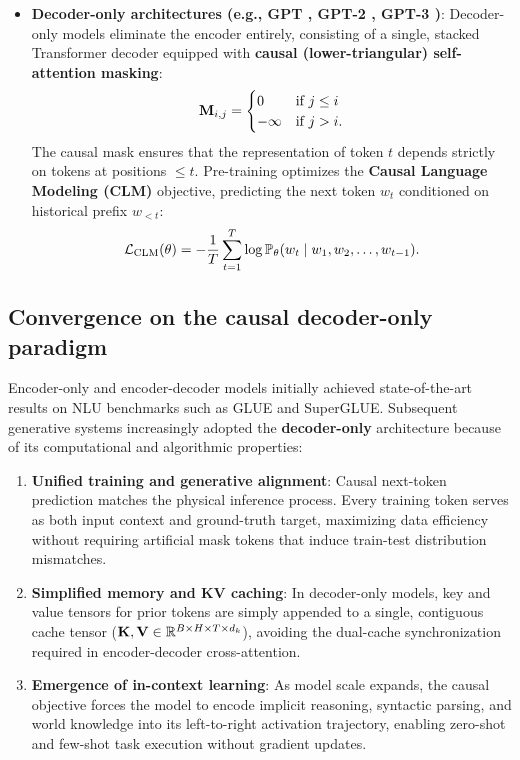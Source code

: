 \documentclass[../../main.tex]{subfiles}
\begin{document}
\begin{itemize}
    \item \textbf{Decoder-only architectures (e.g., GPT \cite{radford2018}, GPT-2 \cite{radford2019}, GPT-3 \cite{brown2020})}:
    Decoder-only models eliminate the encoder entirely, consisting of a single, stacked Transformer decoder equipped with \textbf{causal (lower-triangular) self-attention masking}:
    \begin{equation}
    \label{eq:causal_mask_matrix}
    \mathbf{M}_{i,j} = \begin{cases} 0 & \text{if } j \le i \\ -\infty & \text{if } j > i. \end{cases}
    \end{equation}
    The causal mask ensures that the representation of token $t$ depends strictly on tokens at positions $\le t$. Pre-training optimizes the \textbf{Causal Language Modeling (CLM)} objective, predicting the next token $w_t$ conditioned on historical prefix $w_{<t}$:
    \begin{equation}
    \label{eq:clm_objective_formal}
    \mathcal{L}_{\text{CLM}}(\theta) = -\frac{1}{T} \sum_{t=1}^T \log \mathbb{P}_\theta(w_t \mid w_1, w_2, \dots, w_{t-1}).
    \end{equation}
\end{itemize}

\subsection{Convergence on the causal decoder-only paradigm}
\label{subsec:decoder_only_dominance}

Encoder-only and encoder-decoder models initially achieved state-of-the-art results on NLU benchmarks such as GLUE and SuperGLUE. Subsequent generative systems increasingly adopted the \textbf{decoder-only} architecture because of its computational and algorithmic properties:
\begin{enumerate}
    \item \textbf{Unified training and generative alignment}: Causal next-token prediction matches the physical inference process. Every training token serves as both input context and ground-truth target, maximizing data efficiency without requiring artificial mask tokens that induce train-test distribution mismatches.
    \item \textbf{Simplified memory and KV caching}: In decoder-only models, key and value tensors for prior tokens are simply appended to a single, contiguous cache tensor ($\mathbf{K}, \mathbf{V} \in \mathbb{R}^{B \times H \times T \times d_k}$), avoiding the dual-cache synchronization required in encoder-decoder cross-attention.
    \item \textbf{Emergence of in-context learning}: As model scale expands, the causal objective forces the model to encode implicit reasoning, syntactic parsing, and world knowledge into its left-to-right activation trajectory, enabling zero-shot and few-shot task execution without gradient updates.
\end{enumerate}
\end{document}
